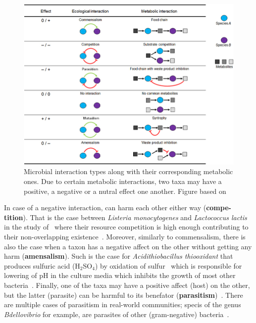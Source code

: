       \begin{figure}
         \centering
         \includegraphics[width=.9\textwidth]{figures/interaction_types.jpg}
         \caption[Microbial interactions types]{Microbial interaction types along 
         with their corresponding metabolic ones.
         Due to certain metabolic interactions, two taxa may have a positive, a negative
         or a nutral effect one another. 
         Figure based on \cite{perez2016metabolic}}
         \label{fig:micro-inter-types}
      \end{figure}

      In case of a negative interaction, can harm each other either way (\textbf{compe-tition}). 
      That is the case between 
      \textit{Listeria monocytogenes} and \textit{Lactococcus lactis} in the study of~\citeauthor{freilich2010large} where their resource competition is high enough
      contributing to their non-overlapping existence~\cite{freilich2010large}.
      Moreover, similarly to commensalism, 
      there is also the case when a taxon has a negative affect on the other
      without getting any harm (\textbf{amensalism}). 
      Such is the case for \textit{Acidithiobacillus thiooxidant} that produces
      sulfuric acid (H$_2$SO$_4$) by oxidation of sulfur~\cite{bobadilla2013stoichiometric} which is responsible for lowering of pH in the culture media which inhibits the growth of most other bacteria~\cite{jin2018ph}.
      Finally, one of the taxa may have a positive affect (host) on the other, but the 
      latter (parasite) can be harmful to its benefator (\textbf{parasitism})~\cite{faust2012microbial}. 
      There are multiple cases of parasitism in real-world communities; 
      specis of the genus \textit{Bdellovibrio} for example, are parasites of other (gram-negative) bacteria~\cite{stolp1979interactions}.

